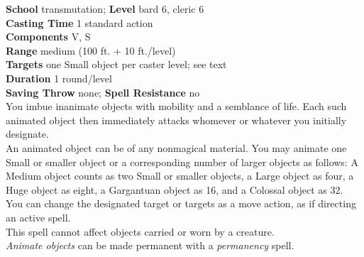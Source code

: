 \textbf{School} transmutation; \textbf{Level} bard 6, cleric 6\\
\textbf{Casting Time} 1 standard action\\
\textbf{Components} V, S\\
\textbf{Range }medium (100 ft. + 10 ft./level)\\
\textbf{Targets} one Small object per caster level; see text\\
\textbf{Duration} 1 round/level\\
\textbf{Saving Throw} none; \textbf{Spell Resistance} no\\
You imbue inanimate objects with mobility and a semblance of life. Each such animated object then immediately attacks whomever or whatever you initially designate.\\
An animated object can be of any nonmagical material. You may animate one Small or smaller object or a corresponding number of larger objects as follows: A Medium object counts as two Small or smaller objects, a Large object as four, a Huge object as eight, a Gargantuan object as 16, and a Colossal object as 32. You can change the designated target or targets as a move action, as if directing an active spell.\\
This spell cannot affect objects carried or worn by a creature.\\
\textit{Animate objects }can be made permanent with a \textit{permanency }spell.\\
